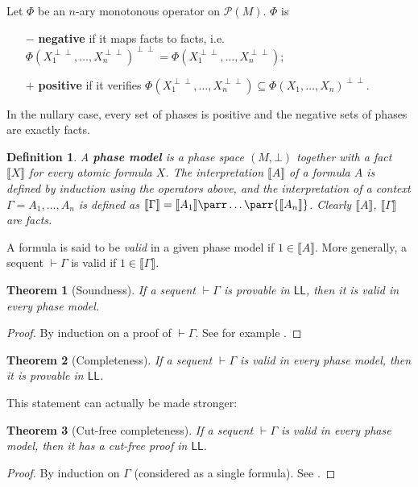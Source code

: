 \documentclass[11pt]{article}
\newtheorem{definition}{Definition}[section]
\newtheorem{theorem}{Theorem}[section]
\newcommand\LL{\textsf{LL}}
\newcommand\0{\textbf{0}}
\newcommand\1{\textbf{1}}
\newcommand\sem[1]{{\llbracket #1 \rrbracket}}
\newcommand\biperp{{\perp\perp}}
\begin{document}
Let $\Phi$ be an $n$-ary monotonous operator on $\mathcal P(M)$. $\Phi$ is
\begin{itemize}
    \item[$-$] \textbf{negative} if it maps facts to facts, i.e. $\Phi(X_1^\biperp, \dots, X_n^\biperp)^\biperp = \Phi(X_1^\biperp, \dots, X_n^\biperp)$;
    \item[$+$] \textbf{positive} if it verifies $\Phi(X_1^\biperp, \dots, X_n^\biperp) \subseteq \Phi(X_1, \dots, X_n)^\biperp$.
\end{itemize}
In the nullary case, every set of phases is positive and the negative sets of phases are exactly facts.

\begin{definition}
    A \textbf{phase model} is a phase space $(M, \bot)$ together with a fact $\sem{X}$ for every atomic
    formula $X$. The interpretation $\sem{A}$ of a formula $A$ is defined by induction using the operators above,
    and the interpretation of a context $\Gamma = A_1, \ldots, A_n$ is defined as $\sem{\Gamma} = \sem{A_1} \parr \dots \parr \sem{A_n}$.
    Clearly $\sem{A}$, $\sem{\Gamma}$ are facts.
\end{definition}

A formula is said to be \emph{valid} in a given phase model if $1 \in \sem{A}$. More generally, a sequent
$\vdash \Gamma$ is valid if $1 \in \sem{\Gamma}$.

\begin{theorem}[Soundness]
    If a sequent $\vdash \Gamma$ is provable in $\LL$, then it is valid in every phase model.
\end{theorem}
\begin{proof}
    By induction on a proof of $\vdash \Gamma$. See for example \cite[theorem 1]{okada}.
\end{proof}

\begin{theorem}[Completeness]
    If a sequent $\vdash \Gamma$ is valid in every phase model, then it is provable in $\LL$.
\end{theorem}

This statement can actually be made stronger:
\begin{theorem}[Cut-free completeness]
    If a sequent $\vdash \Gamma$ is valid in every phase model, then it has a cut-free proof in $\LL$.
\end{theorem}
\begin{proof}
    By induction on $\Gamma$ (considered as a single formula). See \cite[theorem 3]{okada}.
\end{proof}
\end{document}
